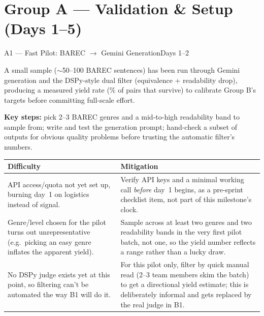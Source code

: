 \documentclass[11pt,a4paper]{article}
\begin{document}
\newpage
\section{Group A --- Validation \& Setup (Days 1--5)}

\begin{milestonehead}{A1 --- Fast Pilot: BAREC $\to$ Gemini Generation}{Days 1--2}
\begin{goalbox}
A small sample ($\sim$50--100 BAREC sentences) has been run through Gemini
generation and the DSPy-style dual filter (equivalence + readability drop),
producing a measured yield rate (\% of pairs that survive) to calibrate
Group B's targets before committing full-scale effort.
\end{goalbox}

\textbf{Key steps:} pick 2--3 BAREC genres and a mid-to-high readability
band to sample from; write and test the generation prompt; hand-check a
subset of outputs for obvious quality problems before trusting the
automatic filter's numbers.

\begin{center}
\small
\begin{tabular}{@{}p{6.3cm}p{6.9cm}@{}}
\toprule
\textbf{Difficulty} & \textbf{Mitigation} \\
\midrule
API access/quota not yet set up, burning day~1 on logistics instead of
signal. & Verify API keys and a minimal working call \emph{before} day~1
begins, as a pre-sprint checklist item, not part of this milestone's clock. \\
\addlinespace
Genre/level chosen for the pilot turns out unrepresentative (e.g.\ picking
an easy genre inflates the apparent yield). & Sample across at least two
genres and two readability bands in the very first pilot batch, not one, so
the yield number reflects a range rather than a lucky draw. \\
\addlinespace
No DSPy judge exists yet at this point, so filtering can't be automated the
way B1 will do it. & For this pilot only, filter by quick manual read
(2--3 team members skim the batch) to get a directional yield estimate; this
is deliberately informal and gets replaced by the real judge in B1. \\
\bottomrule
\end{tabular}
\end{center}
\end{milestonehead}
\end{document}
